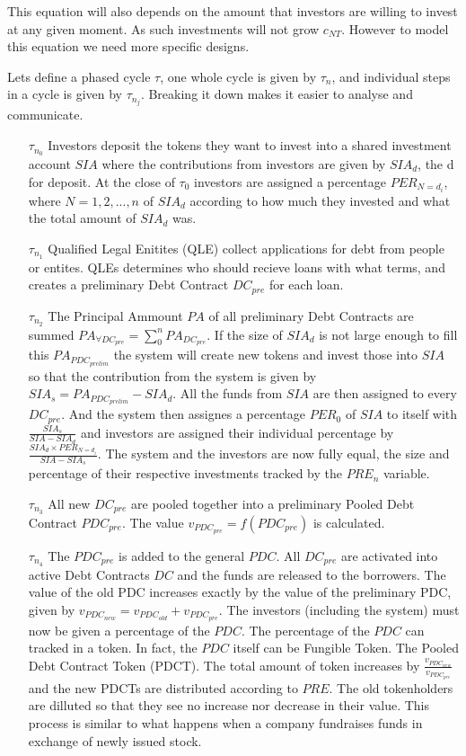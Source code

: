 This equation will also depends on the amount that investors are willing to invest at any given moment. As such investments will not grow $c_{NT}$. However to model this equation we need more specific designs. 

Lets define a phased cycle $\tau$, one whole cycle is given by $\tau_{n}$, and individual steps in a cycle is given by $\tau_{n_{j}}$. Breaking it down makes it easier to analyse and communicate. 
\begin{itemize}
    \item[$\tau_{n_{0}}$] Investors deposit the tokens they want to invest into a shared investment account $SIA$ where the contributions from investors are given by $SIA_{d}$, the d for deposit. At the close of $\tau_{0}$ investors are assigned a percentage $PER_{N=d_{i}}$, where $N=1,2,...,n$ of $SIA_{d}$ according to how much they invested and what the total amount of $SIA_{d}$ was.
    \item[$\tau_{n_{1}}$] Qualified Legal Enitites (QLE) collect applications for debt from people or entites. QLEs determines who should recieve loans with what terms, and creates a preliminary Debt Contract $DC_{pre}$ for each loan.
    \item[$\tau_{n_{2}}$] The Principal Ammount $PA$ of all preliminary Debt Contracts are summed $PA_{\forall DC_{pre}} = \sum_{0}^{n} PA_{DC_{pre}}$. If the size of $SIA_{d}$ is not large enough to fill this $PA_{PDC_{prelim}}$ the system will create new tokens and invest those into $SIA$ so that the contribution from the system is given by $SIA_{s} =  PA_{PDC_{prelim}} - SIA_{d}$. All the funds from $SIA$ are then assigned to every $DC_{pre}$. And the system then assignes a percentage $PER_{0}$ of $SIA$ to itself with $\frac{SIA_{s}}{SIA - SIA_{d}}$ and investors are assigned their individual percentage by $\frac{SIA_{d} \times PER_{N=d_{i}}}{SIA - SIA_{s}}$. The system and the investors are now fully equal, the size and percentage of their respective investments tracked by the $PRE_{n}$ variable. 
    \item[$\tau_{n_{3}}$] All new $DC_{pre}$ are pooled together into a preliminary Pooled Debt Contract $PDC_{pre}$. The value $v_{PDC_{pre}} = f(PDC_{pre})$ is calculated. 
    \item[$\tau_{n_{4}}$] The $PDC_{pre}$ is added to the general $PDC$. All $DC_{pre}$ are activated into active Debt Contracts $DC$ and the funds are released to the borrowers. The value of the old PDC increases exactly by the value of the preliminary PDC, given by $v_{PDC_{new}} = v_{PDC_{old}} + v_{PDC_{pre}}$. The investors (including the system) must now be given a percentage of the $PDC$. The percentage of the $PDC$ can tracked in a token. In fact, the $PDC$ itself can be Fungible Token. The Pooled Debt Contract Token (PDCT). The total amount of token increases by $\frac{v_{PDC_{new}}}{v_{PDC_{pre}}}$ and the new PDCTs are distributed according to $PRE$. The old tokenholders are dilluted so that they see no increase nor decrease in their value. This process is similar to what happens when a company fundraises funds in exchange of newly issued stock. 
\end{itemize}

